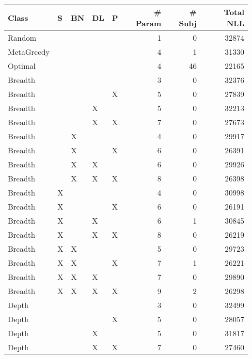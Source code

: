 \begin{tabular}{lllllrrr}
\toprule
      Class &  S & BN & DL &  P &  \# Param &  \# Subj &  Total NLL \\
\midrule
     Random &    &    &    &    &        1 &       0 &      32874 \\
 MetaGreedy &    &    &    &    &        4 &       1 &      31330 \\
    Optimal &    &    &    &    &        4 &      46 &      22165 \\
    Breadth &    &    &    &    &        3 &       0 &      32376 \\
    Breadth &    &    &    &  X &        5 &       0 &      27839 \\
    Breadth &    &    &  X &    &        5 &       0 &      32213 \\
    Breadth &    &    &  X &  X &        7 &       0 &      27673 \\
    Breadth &    &  X &    &    &        4 &       0 &      29917 \\
    Breadth &    &  X &    &  X &        6 &       0 &      26391 \\
    Breadth &    &  X &  X &    &        6 &       0 &      29926 \\
    Breadth &    &  X &  X &  X &        8 &       0 &      26398 \\
    Breadth &  X &    &    &    &        4 &       0 &      30998 \\
    Breadth &  X &    &    &  X &        6 &       0 &      26191 \\
    Breadth &  X &    &  X &    &        6 &       1 &      30845 \\
    Breadth &  X &    &  X &  X &        8 &       0 &      26219 \\
    Breadth &  X &  X &    &    &        5 &       0 &      29723 \\
    Breadth &  X &  X &    &  X &        7 &       1 &      26221 \\
    Breadth &  X &  X &  X &    &        7 &       0 &      29890 \\
    Breadth &  X &  X &  X &  X &        9 &       2 &      26298 \\
      Depth &    &    &    &    &        3 &       0 &      32499 \\
      Depth &    &    &    &  X &        5 &       0 &      28057 \\
      Depth &    &    &  X &    &        5 &       0 &      31817 \\
      Depth &    &    &  X &  X &        7 &       0 &      27460 \\

\end{tabular}
